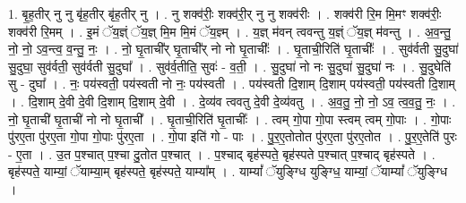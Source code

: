 \documentclass[17pt]{extarticle}
\begin{document}
1. बृ॒ह॒तीर् नु नु बृ॑ह॒तीर् बृ॑ह॒तीर् नु । . नु शक्व॑रीः॒ शक्व॑री॒र् नु नु शक्व॑रीः । . शक्व॑री रि॒म मि॒मꣳ शक्व॑रीः॒ शक्व॑री रि॒मम् । . इ॒मं ॅय॒ज्ञ्ं ॅय॒ज्ञ् मि॒म मि॒मं ॅय॒ज्ञ्म् । . य॒ज्ञ् म॑वन् त्ववन्तु य॒ज्ञ्ं ॅय॒ज्ञ् म॑वन्तु । . अ॒व॒न्तु॒ नो॒ नो॒ ऽव॒न्त्व॒ व॒न्तु॒ नः॒ । . नो॒ घृ॒ताची᳚र् घृ॒ताची᳚र् नो नो घृ॒ताचीः᳚ । . घृ॒ताची॒रिति॑ घृ॒ताचीः᳚ । . सुव॑र्वती सु॒दुघा॑ सु॒दुघा॒ सुव॑र्वती॒ सुव॑र्वती सु॒दुघा᳚ । . सुव॑र्व॒तीति॒ सुवः॑ - व॒ती॒ । . सु॒दुघा॑ नो नः सु॒दुघा॑ सु॒दुघा॑ नः । . सु॒दुघेति॑ सु - दुघा᳚ । . नः॒ पय॑स्वती॒ पय॑स्वती नो नः॒ पय॑स्वती । . पय॑स्वती दि॒शाम् दि॒शाम् पय॑स्वती॒ पय॑स्वती दि॒शाम् । . दि॒शाम् दे॒वी दे॒वी दि॒शाम् दि॒शाम् दे॒वी । . दे॒व्य॑व त्ववतु दे॒वी दे॒व्य॑वतु । . अ॒व॒तु॒ नो॒ नो॒ ऽव॒ त्व॒व॒तु॒ नः॒ । . नो॒ घृ॒ताची॑ घृ॒ताची॑ नो नो घृ॒ताची᳚ । . घृ॒ताची॒रिति॑ घृ॒ताचीः᳚ । . त्वम् गो॒पा गो॒पा स्त्वम् त्वम् गो॒पाः । . गो॒पाः पु॑र‌ए॒ता पु॑र‌ए॒ता गो॒पा गो॒पाः पु॑र‌ए॒ता । . गो॒पा इति॑ गो - पाः । . पु॒र॒‌ए॒तोतोत पु॑र‌ए॒ता पु॑र‌ए॒तोत । . पु॒र॒‌ए॒तेति॑ पुरः - ए॒ता । . उ॒त प॒श्चात् प॒श्चा दु॒तोत प॒श्चात् । . प॒श्चाद् बृह॑स्पते॒ बृह॑स्पते प॒श्चात् प॒श्चाद् बृह॑स्पते । . बृह॑स्पते॒ याम्यां॒ ॅयाम्या॒म् बृह॑स्पते॒ बृह॑स्पते॒ याम्या᳚म् । . याम्यां᳚ ॅयुङ्ग्धि युङ्ग्धि॒ याम्यां॒ ॅयाम्यां᳚ ॅयुङ्ग्धि । \newline
\end{document}
